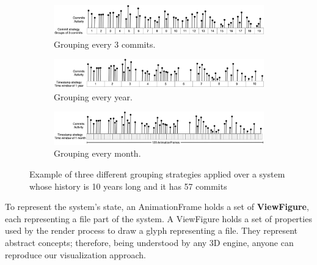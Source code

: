 \begin{figure}
    \begin{center}
        \begin{subfigure}{1\textwidth}
            \includegraphics[width=\linewidth]{TimeWindow1.jpg}
            \caption{Grouping every 3 commits.} 
            \label{fig:TimeWindow1}
        \end{subfigure}
        \begin{subfigure}{1\textwidth}
            \includegraphics[width=\linewidth]{TimeWindow2.jpg}
            \caption{Grouping every year.} 
            \label{fig:TimeWindow2}
        \end{subfigure}
        \begin{subfigure}{1\textwidth}
            \includegraphics[width=\linewidth]{TimeWindow3.jpg}
            \caption{Grouping every month.}
            \label{fig:TimeWindow3}
        \end{subfigure}
        \caption[xample of three different grouping strategies]{Example of three different grouping strategies applied over a system whose history is 10 years long and it has 57 commits}
        \label{fig:TimeWindowExamples}
    \end{center}
\end{figure}



To represent the system's state, an AnimationFrame holds a set of \textbf{ViewFigure}, each representing a file part of the system.
\bigbreak
A ViewFigure holds a set of properties used by the render process to draw a glyph representing a file. They represent abstract concepts; therefore, being understood by any 3D engine, anyone can reproduce our visualization approach. 

